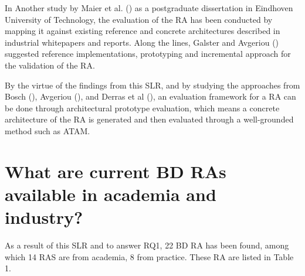 \documentclass[review]{elsarticle}
\begin{document}
In Another study by Maier et al. (\cite{Maier}) as a postgraduate dissertation in Eindhoven University of Technology, the evaluation of the RA has been conducted by mapping it against existing reference and concrete architectures described in industrial whitepapers and reports. Along the lines, Galster and Avgeriou (\cite{galster2011empirically}) suggested reference implementations, prototyping and incremental approach for the validation of the RA.

By the virtue of the findings from this SLR, and by studying the approaches from Bosch (\cite{bosch2000design}), Avgeriou (\cite{avgeriou2003describing}), and Derras et al (\cite{derras2018reference}), an evaluation framework for a RA can be done through architectural prototype evaluation, which means a concrete architecture of the RA is generated and then evaluated through a well-grounded method such as ATAM.

\section{What are current BD RAs available in academia and industry?}

As a result of this SLR and to answer RQ1, 22 BD RA has been found, among which 14 RAS are from academia, 8 from practice. These RA are listed in Table 1.
\end{document}
